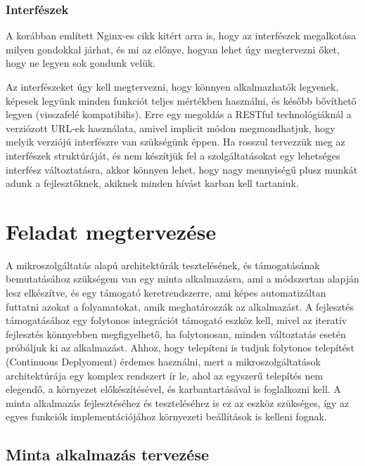 \documentclass[11pt,magyar,a4paper,twoside,]{report}
\begin{document}
\subsection{Interfészek}\label{interfuxe9szek}

A korábban említett Nginx-es cikk kitért arra is, hogy az interfészek
megalkotása milyen gondokkal járhat, és mi az előnye, hogyan lehet úgy
megtervezni őket, hogy ne legyen sok gondunk velük.

Az interfészeket úgy kell megtervezni, hogy könnyen alkalmazhatók
legyenek, képesek legyünk minden funkciót teljes mértékben használni, és
később bővíthető legyen (visszafelé kompatibilis). Erre egy megoldás a
RESTful technológiáknál a verziózott URL-ek használata, amivel implicit
módon megmondhatjuk, hogy melyik verziójú interfészre van szükségünk
éppen. Ha rosszul tervezzük meg az interfészek struktúráját, és nem
készítjük fel a szolgáltatásokat egy lehetséges interfész változtatásra,
akkor könnyen lehet, hogy nagy mennyiségű plusz munkát adunk a
fejlesztőknek, akiknek minden hívást karban kell tartaniuk.

\chapter{Feladat megtervezése}\label{feladat-megtervezuxe9se}

A mikroszolgáltatás alapú architektúrák tesztelésének, és támogatásának
bemutatásához szükségem van egy minta alkalmazásra, ami a módszertan
alapján lesz elkészítve, és egy támogató keretrendszerre, ami képes
automatizáltan futtatni azokat a folyamatokat, amik meghatározzák az
alkalmazást. A fejlesztés támogatásához egy folytonos integrációt
támogató eszköz kell, mivel az iteratív fejlesztés könnyebben
megfigyelhető, ha folytonosan, minden változtatás esetén próbáljuk ki az
alkalmazást. Ahhoz, hogy telepíteni is tudjuk folytonos telepítést
(Continuous Deplyoment) érdemes használni, mert a mikroszolgáltatások
architektúrája egy komplex rendszert ír le, ahol az egyszerű telepítés
nem elegendő, a környezet előkészítésével, és karbantartásával is
foglalkozni kell. A minta alkalmazás fejlesztéséhez és teszteléséhez is
ez az eszköz szükséges, így az egyes funkciók implementációjához
környezeti beállítások is kelleni fognak.

\section{Minta alkalmazás
tervezése}\label{minta-alkalmazuxe1s-tervezuxe9se}
\end{document}
